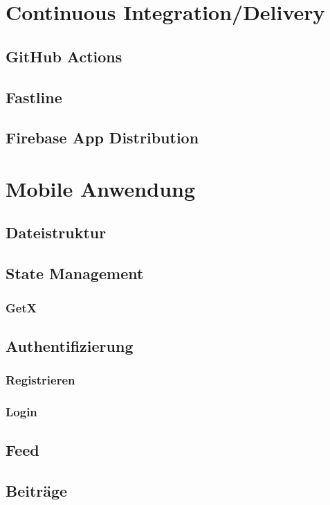 \section{Continuous Integration/Delivery}
\subsection{GitHub Actions}
\subsection{Fastline}
\subsection{Firebase App Distribution}

\section{Mobile Anwendung}
\subsection{Dateistruktur}
\subsection{State Management}
\subsubsection{GetX}

\subsection{Authentifizierung}

\subsubsection{Registrieren}
\subsubsection{Login}

\subsection{Feed}
\subsection{Beiträge}
